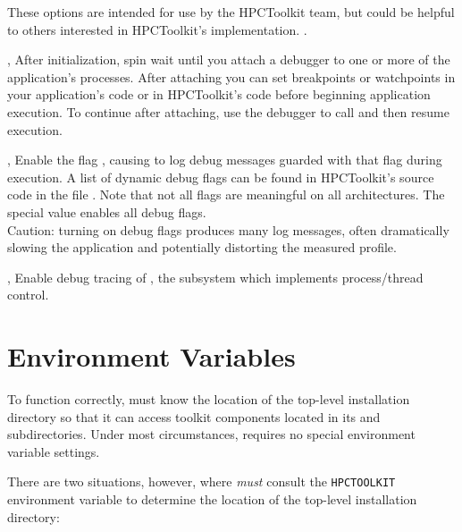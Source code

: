 \documentclass[english]{article}
\begin{document}
\begin{Description}

These options are intended for use by the HPCToolkit team,
but could be helpful to others interested in HPCToolkit's implementation.
.
 
\item[\Opt{-d}, \Opt{--debug}]
After initialization, spin wait until you attach a debugger
to one or more of the application's processes.
After attaching you can set breakpoints or watchpoints in your application's code
or in HPCToolkit's  code before beginning application execution.
To continue after attaching, use the debugger to call 
and then resume execution.

\item[\OptArg{-dd}{flag}, \OptArg{--dynamic-debug}{flag}]
Enable the flag ,
causing  to log debug messages guarded with that flag
during execution.
A list of dynamic debug flags can be found in HPCToolkit's source code
in the file .
Note that not all flags are meaningful on all architectures.
The special value  enables all debug flags.
\\
Caution: turning on debug flags produces many log messages,
often dramatically slowing the application and potentially distorting the measured profile.

\item[\Opt{-md}, \Opt{--monitor-debug}]
Enable debug tracing of , the  subsystem which implements process/thread control.

\end{Description}



\section{Environment Variables}
To function correctly,  must know the location of the  
top-level installation directory so that it can access toolkit components located 
in its  and  subdirectories. 
Under most circumstances,  requires no special environment variable settings.

There are two situations, however, where 
\emph{must} consult the \verb+HPCTOOLKIT+ environment variable to determine the location
of the top-level installation directory: 
\end{document}

